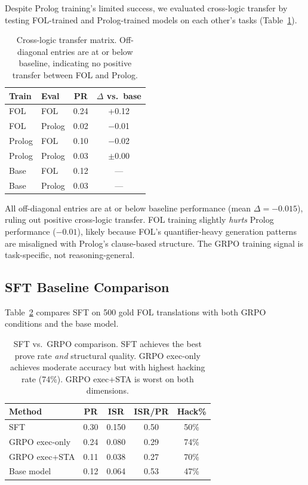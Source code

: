 \documentclass[11pt,a4paper]{article}
\begin{document}
Despite Prolog training's limited success, we evaluated cross-logic transfer by testing FOL-trained and Prolog-trained models on each other's tasks (Table~\ref{tab:transfer}).

\begin{table}[t]
\centering
\small
\begin{tabular}{llcc}
\toprule
\textbf{Train} & \textbf{Eval} & \textbf{PR} & \textbf{$\Delta$ vs.\ base} \\
\midrule
FOL    & FOL    & 0.24 & +0.12 \\
FOL    & Prolog & 0.02 & $-$0.01 \\
Prolog & FOL    & 0.10 & $-$0.02 \\
Prolog & Prolog & 0.03 & $\pm$0.00 \\
Base   & FOL    & 0.12 & --- \\
Base   & Prolog & 0.03 & --- \\
\bottomrule
\end{tabular}
\caption{Cross-logic transfer matrix. Off-diagonal entries are at or below baseline, indicating no positive transfer between FOL and Prolog.}
\label{tab:transfer}
\end{table}

All off-diagonal entries are at or below baseline performance (mean $\Delta = -0.015$), ruling out positive cross-logic transfer.
FOL training slightly \emph{hurts} Prolog performance ($-0.01$), likely because FOL's quantifier-heavy generation patterns are misaligned with Prolog's clause-based structure.
The GRPO training signal is task-specific, not reasoning-general.

\subsection{SFT Baseline Comparison}
\label{sec:sft}

Table~\ref{tab:sft} compares SFT on 500 gold FOL translations with both GRPO conditions and the base model.

\begin{table}[t]
\centering
\small
\begin{tabular}{lcccc}
\toprule
\textbf{Method} & \textbf{PR} & \textbf{ISR} & \textbf{ISR/PR} & \textbf{Hack\%} \\
\midrule
SFT              & 0.30 & 0.150 & 0.50 & 50\% \\
GRPO exec-only   & 0.24 & 0.080 & 0.29 & 74\% \\
GRPO exec+STA    & 0.11 & 0.038 & 0.27 & 70\% \\
Base model       & 0.12 & 0.064 & 0.53 & 47\% \\
\bottomrule
\end{tabular}
\caption{SFT vs.\ GRPO comparison. SFT achieves the best prove rate \emph{and} structural quality. GRPO exec-only achieves moderate accuracy but with highest hacking rate (74\%). GRPO exec+STA is worst on both dimensions.}
\label{tab:sft}
\end{table}
\end{document}
